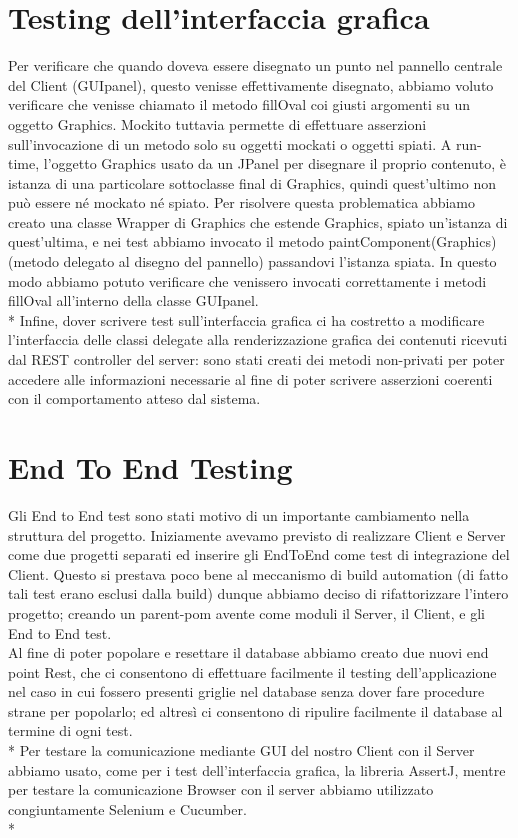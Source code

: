 \section{Testing dell'interfaccia grafica}
Per verificare che quando doveva essere disegnato un punto nel pannello centrale del Client (GUIpanel), questo venisse effettivamente disegnato, abbiamo voluto verificare che venisse chiamato il metodo fillOval coi giusti argomenti su un oggetto Graphics. Mockito tuttavia permette di effettuare asserzioni sull'invocazione di un metodo solo su oggetti mockati o oggetti spiati. A run-time, l'oggetto Graphics usato da un JPanel per disegnare il proprio contenuto, \`e istanza di una particolare sottoclasse final di Graphics, quindi quest'ultimo non pu\`o essere n\'e mockato n\'e spiato. Per risolvere questa problematica abbiamo creato una classe Wrapper di Graphics che estende Graphics, spiato un'istanza di quest'ultima, e nei test abbiamo invocato il metodo paintComponent(Graphics) (metodo delegato al disegno del pannello) passandovi l'istanza spiata. In questo modo abbiamo potuto verificare che venissero invocati correttamente i metodi fillOval all'interno della classe GUIpanel.\\*
Infine, dover scrivere test sull'interfaccia grafica ci ha costretto a modificare l'interfaccia delle classi delegate alla renderizzazione grafica dei contenuti ricevuti dal REST controller del server: sono stati creati dei metodi non-privati per poter accedere alle informazioni necessarie al fine di poter scrivere asserzioni coerenti con il comportamento atteso dal sistema.
\section{End To End Testing}
Gli End to End test sono stati motivo di un importante cambiamento nella struttura del progetto. Iniziamente avevamo previsto di realizzare Client e Server come due progetti separati ed inserire gli EndToEnd come test di integrazione del Client. Questo si prestava poco bene al meccanismo di build automation (di fatto tali test erano esclusi dalla build) dunque abbiamo deciso di rifattorizzare l'intero progetto; creando un parent-pom avente come moduli il Server, il Client, e gli End to End test.\\
Al fine di poter popolare e resettare il database abbiamo creato due nuovi end point Rest, che ci consentono di effettuare facilmente il testing dell'applicazione nel caso in cui fossero presenti griglie nel database senza dover fare procedure strane per popolarlo; ed altres\`i ci consentono di ripulire facilmente il database al termine di ogni test.\\*
Per testare la comunicazione mediante GUI del nostro Client con il Server abbiamo usato, come per i test dell'interfaccia grafica, la libreria AssertJ, mentre per testare la comunicazione Browser con il server abbiamo utilizzato congiuntamente Selenium e Cucumber.\\*

